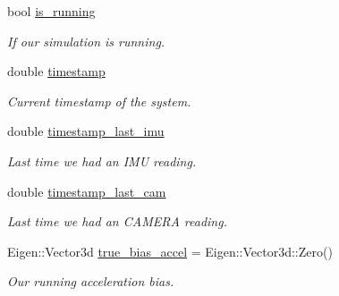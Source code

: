 \begin{DoxyCompactItemize}
bool \hyperlink{classov__init_1_1SimulatorInit_a8abb917e0f329e5d8602692a5f4c2776}{is\+\_\+running}
\begin{DoxyCompactList}\small\item\em If our simulation is running. \end{DoxyCompactList}\item 
\mbox{\label{classov__init_1_1SimulatorInit_a69cfbc8778564611b8b81e5fdb1d5736}} 
double \hyperlink{classov__init_1_1SimulatorInit_a69cfbc8778564611b8b81e5fdb1d5736}{timestamp}
\begin{DoxyCompactList}\small\item\em Current timestamp of the system. \end{DoxyCompactList}\item 
\mbox{\label{classov__init_1_1SimulatorInit_aad6608fa7e7a00ef588ec326c3f03729}} 
double \hyperlink{classov__init_1_1SimulatorInit_aad6608fa7e7a00ef588ec326c3f03729}{timestamp\+\_\+last\+\_\+imu}
\begin{DoxyCompactList}\small\item\em Last time we had an I\+MU reading. \end{DoxyCompactList}\item 
\mbox{\label{classov__init_1_1SimulatorInit_ad35d52befdec1e430bdd13c49a418fc4}} 
double \hyperlink{classov__init_1_1SimulatorInit_ad35d52befdec1e430bdd13c49a418fc4}{timestamp\+\_\+last\+\_\+cam}
\begin{DoxyCompactList}\small\item\em Last time we had an C\+A\+M\+E\+RA reading. \end{DoxyCompactList}\item 
\mbox{\label{classov__init_1_1SimulatorInit_ab3f60dfbc69a9b510d9278e9d21ef31e}} 
Eigen\+::\+Vector3d \hyperlink{classov__init_1_1SimulatorInit_ab3f60dfbc69a9b510d9278e9d21ef31e}{true\+\_\+bias\+\_\+accel} = Eigen\+::\+Vector3d\+::\+Zero()
\begin{DoxyCompactList}\small\item\em Our running acceleration bias. \end{DoxyCompactList}\item 
\mbox{\label{classov__init_1_1SimulatorInit_a23a46e6cdbe66968bb6d4174a1aa6861}} 

\end{DoxyCompactItemize}
